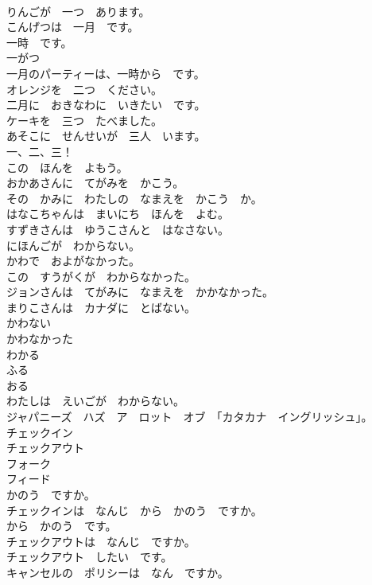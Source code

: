 \documentclass[8pt]{extreport}
\begin{document}
\begin{CJK}{UTF8}{min}
\\	りんごが　一つ　あります。	
\\	こんげつは　一月　です。	
\\	一時　です。	
\\	一がつ	
\\	一月のパーティーは、一時から　です。	
\\	オレンジを　二つ　ください。	
\\	二月に　おきなわに　いきたい　です。	
\\	ケーキを　三つ　たべました。	
\\	あそこに　せんせいが　三人　います。	
\\	一、二、三！	
\\	この　ほんを　よもう。	
\\	おかあさんに　てがみを　かこう。	
\\	その　かみに　わたしの　なまえを　かこう　か。	
\\	はなこちゃんは　まいにち　ほんを　よむ。	
\\	すずきさんは　ゆうこさんと　はなさない。	
\\	にほんごが　わからない。	
\\	かわで　およがなかった。	
\\	この　すうがくが　わからなかった。	
\\	ジョンさんは　てがみに　なまえを　かかなかった。	
\\	まりこさんは　カナダに　とばない。	
\\	かわない	
\\	かわなかった	
\\	わかる	
\\	ふる	
\\	おる	
\\	わたしは　えいごが　わからない。	
\\	ジャパニーズ　ハズ　ア　ロット　オブ　「カタカナ　イングリッシュ」。	
\\	チェックイン	
\\	チェックアウト	
\\	フォーク	
\\	フィード	
\\	かのう　ですか。	
\\	チェックインは　なんじ　から　かのう　ですか。	
\\	から　かのう　です。	
\\	チェックアウトは　なんじ　ですか。	
\\	チェックアウト　したい　です。	
\\	キャンセルの　ポリシーは　なん　ですか。	

\end{CJK}
\end{document}
